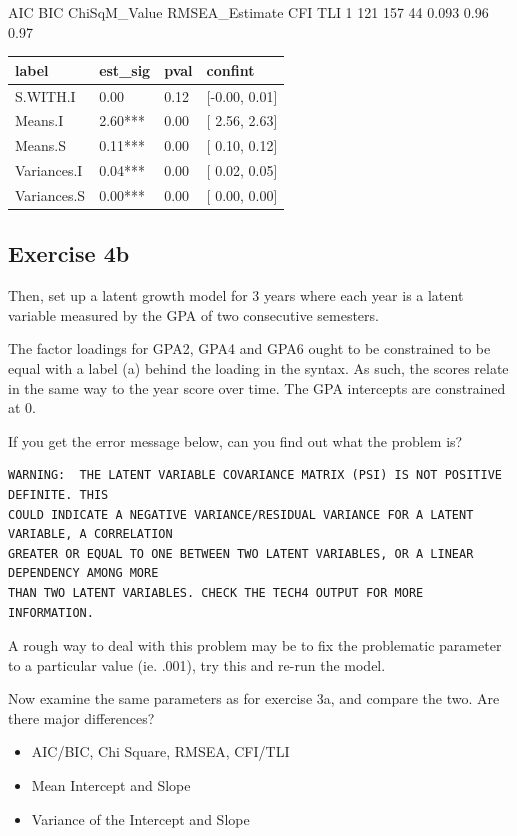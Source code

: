 \documentclass[
]{book}
\providecommand{\tightlist}{%
  \setlength{\itemsep}{0pt}\setlength{\parskip}{0pt}}
\begin{document}
AIC BIC ChiSqM\_Value RMSEA\_Estimate CFI TLI
1 121 157 44 0.093 0.96 0.97

\begin{tabular}[t]{l|l|l|l}
\hline
label & est\_sig & pval & confint\\
\hline
S.WITH.I & 0.00 & 0.12 & [-0.00,  0.01]\\
\hline
Means.I & 2.60*** & 0.00 & [ 2.56,  2.63]\\
\hline
Means.S & 0.11*** & 0.00 & [ 0.10,  0.12]\\
\hline
Variances.I & 0.04*** & 0.00 & [ 0.02,  0.05]\\
\hline
Variances.S & 0.00*** & 0.00 & [ 0.00,  0.00]\\
\hline
\end{tabular}

\hypertarget{exercise-4b}{%
\subsection{Exercise 4b}\label{exercise-4b}}

Then, set up a latent growth model for 3 years where each year is a latent variable measured by the GPA of two
consecutive semesters.

The factor loadings for GPA2, GPA4 and GPA6 ought to be constrained to be equal with a label (a) behind
the loading in the syntax. As such, the scores relate in the same way to the year score over time. The GPA
intercepts are constrained at 0.

If you get the error message below, can you find out what the problem is?

\begin{verbatim}
WARNING:  THE LATENT VARIABLE COVARIANCE MATRIX (PSI) IS NOT POSITIVE     DEFINITE. THIS 
COULD INDICATE A NEGATIVE VARIANCE/RESIDUAL VARIANCE FOR A LATENT VARIABLE, A CORRELATION 
GREATER OR EQUAL TO ONE BETWEEN TWO LATENT VARIABLES, OR A LINEAR DEPENDENCY AMONG MORE 
THAN TWO LATENT VARIABLES. CHECK THE TECH4 OUTPUT FOR MORE INFORMATION. 
\end{verbatim}

A rough way to deal with this problem may be to fix the problematic parameter to a particular value (ie. .001), try this and re-run the model.

Now examine the same parameters as for exercise 3a, and compare the two. Are there
major differences?

\begin{itemize}
\tightlist
\item
  AIC/BIC, Chi Square, RMSEA, CFI/TLI
\item
  Mean Intercept and Slope
\item
  Variance of the Intercept and Slope
\end{itemize}
\end{document}
